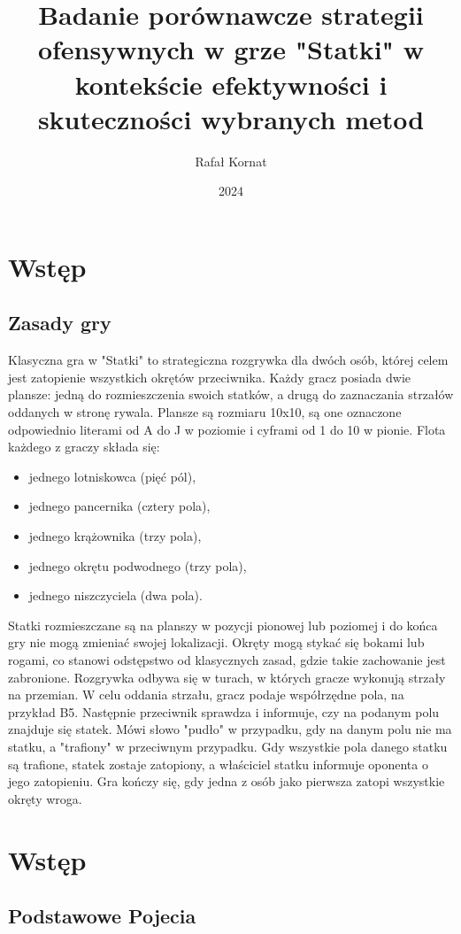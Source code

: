 \documentclass[magisterska]{pracadypl}
\author{Rafał Kornat}
\title{Badanie porównawcze strategii ofensywnych w grze "Statki" w kontekście efektywności i skuteczności wybranych metod}
\date{2024}
\begin{document}
\maketitle
\tableofcontents
\newpage


\chapter{Wstęp}

\section{Zasady gry}
Klasyczna gra w "Statki" to strategiczna rozgrywka dla dwóch osób, której 
celem jest zatopienie wszystkich okrętów przeciwnika. 
Każdy gracz posiada dwie plansze: jedną do rozmieszczenia swoich statków, a drugą do zaznaczania strzałów oddanych w stronę rywala. 
Plansze są rozmiaru 10x10, są one oznaczone odpowiednio literami od A do J w poziomie i cyframi od 1 do 10 w pionie.
Flota każdego z graczy składa się: 
\begin{itemize}
  \item jednego lotniskowca (pięć pól), 
  \item jednego pancernika (cztery pola), 
  \item jednego krążownika (trzy pola),
  \item jednego okrętu podwodnego (trzy pola),
  \item jednego niszczyciela (dwa pola).
\end{itemize}
Statki rozmieszczane są na planszy w pozycji pionowej lub poziomej i do końca gry nie mogą zmieniać swojej lokalizacji. 
Okręty mogą stykać się bokami lub rogami, co stanowi odstępstwo od klasycznych zasad, gdzie takie zachowanie jest zabronione.
Rozgrywka odbywa się w turach, w których gracze wykonują strzały na przemian.
W celu oddania strzału, gracz podaje współrzędne pola, na przykład B5. 
Następnie przeciwnik sprawdza i informuje, czy na podanym polu znajduje się statek.
Mówi słowo "pudło" w przypadku, gdy na danym polu nie ma statku, a "trafiony" w przeciwnym przypadku.
Gdy wszystkie pola danego statku są trafione, statek zostaje zatopiony, a właściciel statku informuje oponenta o jego zatopieniu.
Gra kończy się, gdy jedna z osób jako pierwsza zatopi wszystkie okręty wroga.
\chapter{Wstęp}
\section{Podstawowe Pojecia}
\end{document}
